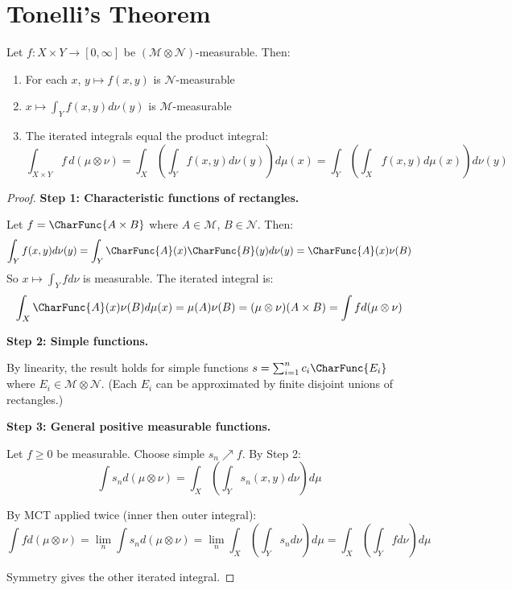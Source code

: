 \section{Tonelli's Theorem}

\begin{theorem}[Tonelli]
Let $f: X \times Y \to [0, \infty]$ be $(\mathcal{M} \otimes \mathcal{N})$-measurable. Then:
\begin{enumerate}
    \item For each $x$, $y \mapsto f(x, y)$ is $\mathcal{N}$-measurable
    \item $x \mapsto \int_Y f(x, y) d\nu(y)$ is $\mathcal{M}$-measurable
    \item The iterated integrals equal the product integral:
    \[ \int_{X \times Y} f \, d(\mu \otimes \nu) = \int_X \left(\int_Y f(x, y) d\nu(y)\right) d\mu(x) = \int_Y \left(\int_X f(x, y) d\mu(x)\right) d\nu(y) \]
\end{enumerate}
\end{theorem}

\begin{proof}
\textbf{Step 1: Characteristic functions of rectangles.}

Let $f = \CharFunc{A \times B}$ where $A \in \mathcal{M}$, $B \in \mathcal{N}$. Then:
\[ \int_Y f(x, y) d\nu(y) = \int_Y \CharFunc{A}(x) \CharFunc{B}(y) d\nu(y) = \CharFunc{A}(x) \nu(B) \]
So $x \mapsto \int_Y f d\nu$ is measurable. The iterated integral is:
\[ \int_X \CharFunc{A}(x) \nu(B) d\mu(x) = \mu(A) \nu(B) = (\mu \otimes \nu)(A \times B) = \int f d(\mu \otimes \nu) \]

\textbf{Step 2: Simple functions.}

By linearity, the result holds for simple functions $s = \sum_{i=1}^n c_i \CharFunc{E_i}$ where $E_i \in \mathcal{M} \otimes \mathcal{N}$. (Each $E_i$ can be approximated by finite disjoint unions of rectangles.)

\textbf{Step 3: General positive measurable functions.}

Let $f \geq 0$ be measurable. Choose simple $s_n \nearrow f$. By Step 2:
\[ \int s_n d(\mu \otimes \nu) = \int_X \left(\int_Y s_n(x,y) d\nu\right) d\mu \]

By MCT applied twice (inner then outer integral):
\[ \int f d(\mu \otimes \nu) = \lim_n \int s_n d(\mu \otimes \nu) = \lim_n \int_X \left(\int_Y s_n d\nu\right) d\mu = \int_X \left(\int_Y f d\nu\right) d\mu \]

Symmetry gives the other iterated integral.
\end{proof}

